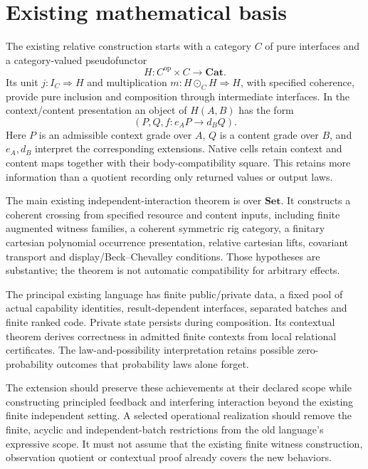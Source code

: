 \documentclass[11pt,a4paper]{article}
\newcommand{\Cat}{\mathbf{Cat}}
\begin{document}
\section{Existing mathematical basis}\label{sec:basis}

The existing relative construction starts with a category \(C\) of pure interfaces and a category-valued pseudofunctor
\[
H:C^{\mathrm{op}}\times C\longrightarrow\Cat.
\]
Its unit \(j:I_C\Rightarrow H\) and multiplication \(m:H\odot_C H\Rightarrow H\), with specified coherence, provide pure inclusion and composition through intermediate interfaces. In the context/content presentation an object of \(H(A,B)\) has the form
\[
(P,Q,f:e_A P\longrightarrow d_B Q).
\]
Here \(P\) is an admissible context grade over \(A\), \(Q\) is a content grade over \(B\), and \(e_A,d_B\) interpret the corresponding extensions. Native cells retain context and content maps together with their body-compatibility square. This retains more information than a quotient recording only returned values or output laws.

The main existing independent-interaction theorem is over \(\mathbf{Set}\). It constructs a coherent crossing from specified resource and content inputs, including finite augmented witness families, a coherent symmetric rig category, a finitary cartesian polynomial occurrence presentation, relative cartesian lifts, covariant transport and display/Beck--Chevalley conditions. Those hypotheses are substantive; the theorem is not automatic compatibility for arbitrary effects.

The principal existing language has finite public/private data, a fixed pool of actual capability identities, result-dependent interfaces, separated batches and finite ranked code. Private state persists during composition. Its contextual theorem derives correctness in admitted finite contexts from local relational certificates. The law-and-possibility interpretation retains possible zero-probability outcomes that probability laws alone forget.

The extension should preserve these achievements at their declared scope while constructing principled feedback and interfering interaction beyond the existing finite independent setting. A selected operational realization should remove the finite, acyclic and independent-batch restrictions from the old language's expressive scope. It must not assume that the existing finite witness construction, observation quotient or contextual proof already covers the new behaviors.
\end{document}
